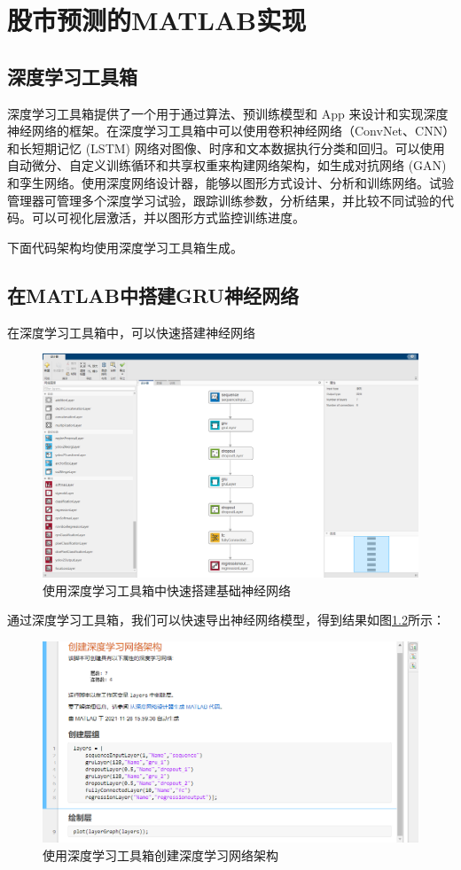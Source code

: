 \documentclass{jnuthesis}
\begin{document}
\chapter{股市预测的MATLAB实现}
\section{深度学习工具箱}

深度学习工具箱提供了一个用于通过算法、预训练模型和 App 来设计和实现深度神经网络的框架。在深度学习工具箱中可以使用卷积神经网络（ConvNet、CNN）和长短期记忆 (LSTM) 网络对图像、时序和文本数据执行分类和回归。可以使用自动微分、自定义训练循环和共享权重来构建网络架构，如生成对抗网络 (GAN) 和孪生网络。使用深度网络设计器，能够以图形方式设计、分析和训练网络。试验管理器可管理多个深度学习试验，跟踪训练参数，分析结果，并比较不同试验的代码。可以可视化层激活，并以图形方式监控训练进度。\cite{MathWorks}


下面代码架构均使用深度学习工具箱生成。
\section{在MATLAB中搭建GRU神经网络}



在深度学习工具箱中，可以快速搭建神经网络
\begin{figure}[H]
	\centering
	\includegraphics[width=0.8\linewidth]{pic/screenshot018}
	\caption{使用深度学习工具箱中快速搭建基础神经网络}
	\label{fig:screenshot017}
\end{figure}

通过深度学习工具箱，我们可以快速导出神经网络模型，得到结果如图\ref{fig:screenshot019}所示：
\begin{figure}[H]
	\centering
	\includegraphics[width=0.7\linewidth]{pic/screenshot019}
	\caption{使用深度学习工具箱创建深度学习网络架构}
	\label{fig:screenshot019}
\end{figure}
\end{document}
